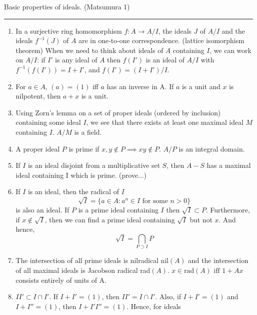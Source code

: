 \begin{notes}
      Basic properties of ideals. (Matsumura 1)
\end{notes}
\hrule

\begin{enumerate}
      \item
            In a surjective ring homomorphism $f:A \to A/I$, the ideals $J$
            of $A/I$ and the ideals $f^{-1}(J)$ of $A$ are in one-to-one
            correspondence. (lattice isomorphism theorem) When we need to think about ideals of $A$
            containing $I$, we can work on $A/I$: if $I'$ is any ideal of
            $A$ then $f(I')$ is an ideal of $A/I$ with $f^{-1}(f(I'))=I+I'$,
            and $f(I') = (I+I')/I$.
      \item
            For $a \in A$, $(a)=(1)$ iff $a$ has an inverse in A.
            If $a$ is a unit and $x$ is nilpotent, then $a+x$ is a unit.
      \item
            Using Zorn's lemma on a set of proper ideals (ordered by inclusion)
            containing some ideal $I$, we see that
            there exists at least one maximal ideal $M$ containing $I$.
            $A/M$ is a field.
      \item
            A proper ideal $P$ is prime if $x,y \notin P \implies xy \notin
                  P$. $A/P$ is an integral domain.
      \item
            If $I$ is an ideal disjoint from a multiplicative set $S$, then $A-S$
            has a maximal ideal containing I which is prime. (prove...)
      \item
            If $I$ is an ideal, then the radical of $I$
            $$ \sqrt{I}=\{a\in A : a^n \in I \text{ for some } n>0\}$$
            is also an ideal. If $P$ is a prime ideal containing $I$ then $\sqrt{I}
                  \subset P$. Furthermore, if $x \notin \sqrt{I}$, then we can find
            a prime ideal containing $\sqrt{I}$ but not $x$. And hence,
            $$\sqrt{I}=\bigcap_{P \supset I}{P}$$
      \item
            The intersection of all prime ideals is nilradical nil$(A)$ and the
            intersection of all maximal ideals is Jacobson radical rad$(A)$.
            $x\in \text{rad}(A) \text{ iff } 1+Ax$ consists entirely of units of A.
      \item\label{idealsinduction}
            $II' \subset I\cap I'$. If $I+I'=(1)$, then $II' = I\cap I'$. Also,
            if $I+I'=(1)$ and $I+I''=(1)$, then $I+I'I'' = (1)$. Hence, for ideals

\end{enumerate}

